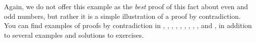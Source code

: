 %
%
\begin{para}Again, we do not offer this example as the {\em best} proof of this fact about even and odd numbers, but rather it is a simple illustration of a proof by contradiction.  You can find examples of proofs by contradiction in
,
,
,
,
,
,
,
,
,
and
,
%
in addition to several examples and solutions to exercises.\end{para}

